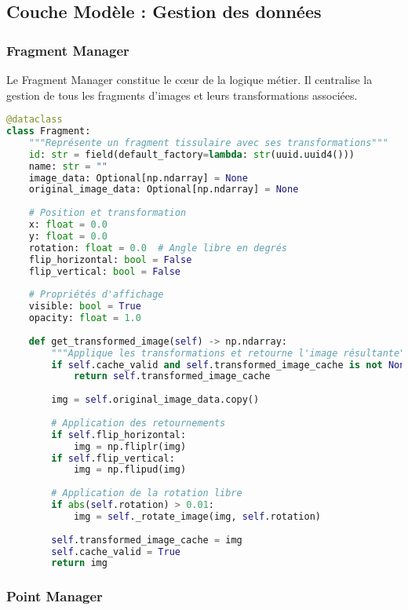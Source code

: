 \documentclass[12pt,a4paper]{report}
\begin{document}
\subsection{Couche Modèle : Gestion des données}

\subsubsection{Fragment Manager}

Le Fragment Manager constitue le cœur de la logique métier. Il centralise la gestion de tous les fragments d'images et leurs transformations associées.

\begin{lstlisting}[language=Python, caption=Structure de données Fragment]
@dataclass
class Fragment:
    """Représente un fragment tissulaire avec ses transformations"""
    id: str = field(default_factory=lambda: str(uuid.uuid4()))
    name: str = ""
    image_data: Optional[np.ndarray] = None
    original_image_data: Optional[np.ndarray] = None
    
    # Position et transformation
    x: float = 0.0
    y: float = 0.0
    rotation: float = 0.0  # Angle libre en degrés
    flip_horizontal: bool = False
    flip_vertical: bool = False
    
    # Propriétés d'affichage
    visible: bool = True
    opacity: float = 1.0
    
    def get_transformed_image(self) -> np.ndarray:
        """Applique les transformations et retourne l'image résultante"""
        if self.cache_valid and self.transformed_image_cache is not None:
            return self.transformed_image_cache
        
        img = self.original_image_data.copy()
        
        # Application des retournements
        if self.flip_horizontal:
            img = np.fliplr(img)
        if self.flip_vertical:
            img = np.flipud(img)
        
        # Application de la rotation libre
        if abs(self.rotation) > 0.01:
            img = self._rotate_image(img, self.rotation)
        
        self.transformed_image_cache = img
        self.cache_valid = True
        return img
\end{lstlisting}

\subsubsection{Point Manager}
\end{document}
